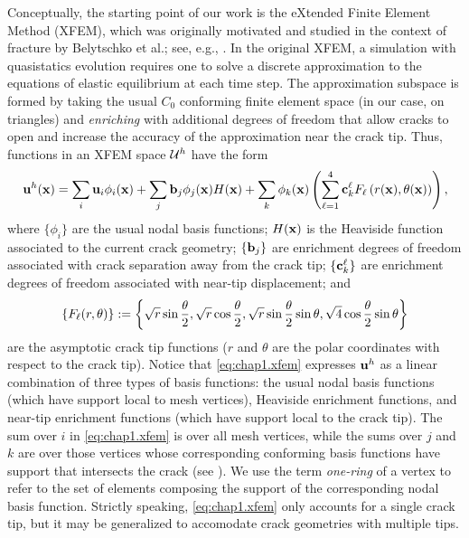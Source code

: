 Conceptually, the starting point of our work is the eXtended Finite Element Method \linebreak[4] (XFEM), which was originally motivated and studied in the context of fracture by Belytschko et al.; see, e.g., \cite{Moes99}. In the original XFEM, a simulation with quasistatics evolution requires one to solve a discrete approximation to the equations of elastic equilibrium at each time step. The approximation subspace is formed by taking the usual $C_0$ conforming finite element space (in our case, on triangles) and \emph{enriching} with additional degrees of freedom that allow cracks to open and increase the accuracy of the approximation near the crack tip. Thus, functions in an XFEM space $\mathcal{U}^h$  have the form
\begin{equation} \label{eq:chap1.xfem}
\mathbf{u}^h(\mathbf{x}) = \sum_i \mathbf{u}_i \phi_i(\mathbf{x}) + \sum_j \mathbf{b}_j \phi_j(\mathbf{x}) H(\mathbf{x}) + \sum_k \phi_k(\mathbf{x}) \left( \sum_{\ell = 1}^4 \mathbf{c}_k^{\ell} F_{\ell} \left( r(\mathbf{x}), \theta(\mathbf{x}) \right) \right),
\end{equation}
where $\{\phi_i\}$ are the usual nodal basis functions; $H(\mathbf{x})$ is the Heaviside function associated to the current crack geometry; $\{\mathbf{b}_j\}$ are enrichment degrees of freedom associated with crack separation away from the crack tip; $ \{\mathbf{c}_k^\ell\}$ are enrichment degrees of freedom associated with near-tip displacement; and
\begin{equation*}
\left\lbrace F_{\ell}(r,\theta) \right\rbrace := \left\lbrace  \sqrt{r} \sin \frac{\theta}{2}, \sqrt{r} \cos \frac{\theta}{2}, \sqrt{r} \sin \frac{\theta}{2} \sin \theta, \sqrt{4} \cos \frac{\theta}{2} \sin \theta  \right\rbrace
\end{equation*}
are the asymptotic crack tip functions ($r$ and $\theta$ are the polar coordinates with respect to the crack tip). Notice that \eqref{eq:chap1.xfem} expresses $\mathbf{u}^h$ as a linear combination of three types of basis functions: the usual nodal basis functions (which have support local to mesh vertices), Heaviside enrichment functions, and near-tip enrichment functions (which have support local to the crack tip). The sum over $i$ in \eqref{eq:chap1.xfem} is over all mesh vertices, while the sums over $j$ and $k$ are over those vertices whose corresponding conforming basis functions have support that intersects the crack (see \cite{Moes99}). We use the term \emph{one-ring} of a vertex to refer to the set of elements composing the support of the corresponding nodal basis function. Strictly speaking, \eqref{eq:chap1.xfem} only accounts for a single crack tip, but it may be generalized to accomodate crack geometries with multiple tips.

